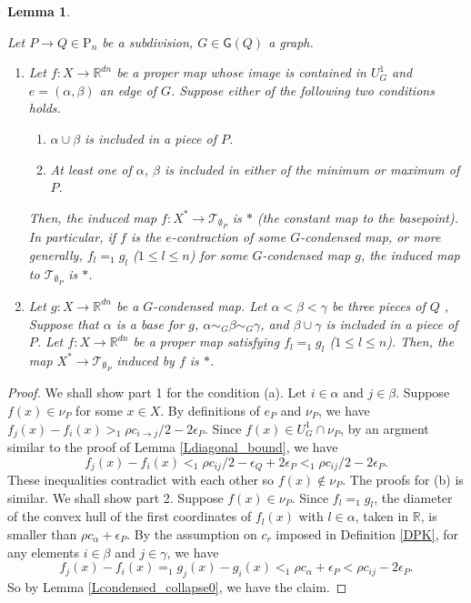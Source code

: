\documentclass[reqno]{amsart}
\theoremstyle{definition}
\theoremstyle{plain}
\newtheorem{lem}[defi]{Lemma}
\newcommand{\eps}{\epsilon}
\newcommand{\TT}{\mathcal{T}} %
\newcommand{\GG}{\mathsf{G}}%
\newcommand{\RR}{\mathbb{R}}
\newcommand{\PP}{\mathrm{P}} %
\begin{document}
\begin{lem}\label{Lcondensed_collapse}

 Let $P\to Q\in \PP_n$ be a subdivision, $G\in\GG(Q)$ a graph.

\begin{enumerate}
\item 

Let  $f:X\to \RR^{dn}$ be a proper map whose image is contained in $U^1_G$ and $e=(\alpha,\beta)$ an edge of $G$.  Suppose  either of the following two conditions holds.
\begin{enumerate}
 \item $\alpha\cup \beta$ is included in a  piece of $P$.
\item At least one of $\alpha$, $\beta$ is included in either of the minimum or maximum of $P$.
\end{enumerate} Then, the induced map $f :X^*\to \TT_{\emptyset_P}$ is $*$ (the constant map to the basepoint). In particular, if $f$ is the $e$-contraction of some $G$-condensed map, or more generally, $f_l=_1g_l$  ($1\leq l\leq n$)  for some $G$-condensed map $g$, the induced map to $\TT_{\emptyset_P}$ is $*$.
\item Let $g:X\to \RR^{dn}$ be a $G$-condensed map. Let $\alpha<\beta<\gamma$ be three  pieces of  $Q$ , Suppose that $\alpha$ is a base for $g$, $\alpha\sim_G\beta\sim_G\gamma$,  and $\beta\cup\gamma$ is included in a piece of $P$. Let $f:X\to \RR^{dn}$ be a proper map satisfying $f_l=_1g_l$ ($1\leq l\leq n$). Then, the map $X^*\to \TT_{\emptyset_P}$ induced by $f$  is  $*$.
\end{enumerate}
\end{lem}
\begin{proof}
We shall show part 1 for the condition (a).  Let $i\in \alpha$ and $j\in \beta$. Suppose $f(x)\in \nu_P$ for some $x\in X$. By definitions of $e_P$ and $\nu_P$, we have
$f_{j}(x)-f_{i}(x)>_1 \rho c_{i\to j}/2-2\eps_P$. Since $f(x)\in U^1_G\cap \nu_P$, by an argment similar to the proof of Lemma \ref{Ldiagonal_bound}, we have
\[
 f_j(x)-f_i(x)<_1\rho c_{ij}/2-\eps_Q+2\eps_P<_1 \rho c_{ij}/2-2\eps_P.
\]
 These inequalities contradict with each other so $f(x)\not\in \nu_P$. The proofs for (b) is similar. We shall show part 2. Suppose $f(x)\in \nu_P$. Since $f_l=_1g_l$, the diameter of  the convex hull of the first coordinates of $f_l(x)$ with $l\in \alpha$, taken in $\RR$, is smaller than $\rho c_{\alpha}+\eps_P$. By the assumption on $c_r$ imposed in Definition \ref{DPK}, for any elements $i\in \beta$ and $j\in \gamma$, we have
\[
f_j(x)-f_i(x)=_1g_j(x)-g_i(x)<_1\rho c_\alpha+\eps_P<\rho c_{ij}-2\eps_P.
\]
So by Lemma \ref{Lcondensed_collapse0}, we have the claim.  
\end{proof}
\end{document}
